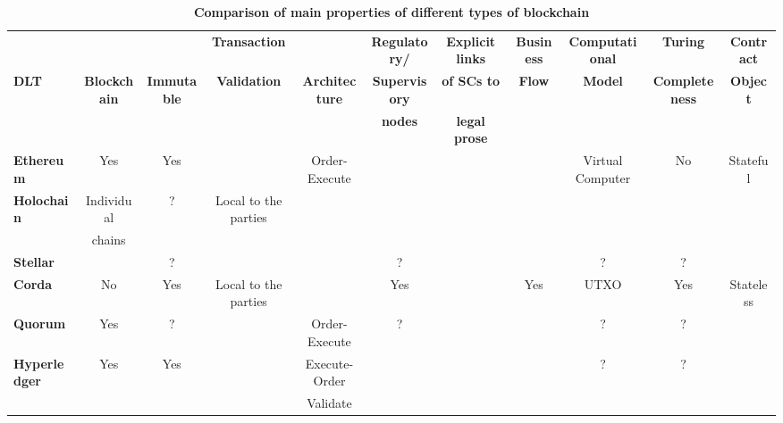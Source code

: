 \begin{sidewaystable}
\begin{centering}
{\begin{tabular}{| l | c | c | c | c | c | c | c | c | c | c |}
\hline
				& \textbf{}  			& \textbf{}  			& \textbf{Transaction} 	&
				& \textbf{Regulatory/} 	& \textbf{Explicit links}	&\textbf{Business}
				& \textbf{Computational} 	& \textbf{Turing}		&\textbf{Contract} \\
\textbf{DLT}		& \textbf{Blockchain} 	& \textbf{Immutable} 		& \textbf{Validation} 		& \textbf{Architecture} 
				& \textbf{Supervisory} 	& \textbf{of SCs to}		&\textbf{Flow} 
				& \textbf{Model} 		& \textbf{Completeness}	&\textbf{Object} \\
				& \textbf{} 				& \textbf{} 				& \textbf{} 				&
				& \textbf{nodes} 		& \textbf{legal prose}		&\textbf{} 
				& \textbf{} 				& \textbf{}				&\textbf{} \\
\hline
\hline
\textbf{Ethereum}	&Yes			&Yes		&				&Order-Execute	&
				&			&		&Virtual Computer	&No				&Stateful \\
\hline
\textbf{Holochain}	&Individual	&?		&Local to the parties	&				&
				&			& 		&				&				& \\
				&chains		&		&				&				&
				&			& 		&				&				& \\
\hline
\textbf{Stellar}		&			&?		&				&				&?
				&			& 		&?				&?				&\\
\hline
\textbf{Corda} 		&No			&Yes		&Local to the parties	&				&Yes
				&			&Yes		&UTXO			&Yes				&Stateless\\
\hline
\textbf{Quorum} 	&Yes			&?		&				&Order-Execute	&?
				&			& 		&?				&?				&\\
\hline
\textbf{Hyperledger}	&Yes			&Yes		&				&Execute-Order	&
				&			& 		&?				&?				& \\
 				&			&		&				&Validate			&
				&			& 		&				&				& \\
\hline
\end{tabular}}
\caption{\bf \small Comparison of main properties of different types of blockchain}
\label{blockchain_type}
\end{centering}
\end{sidewaystable}





